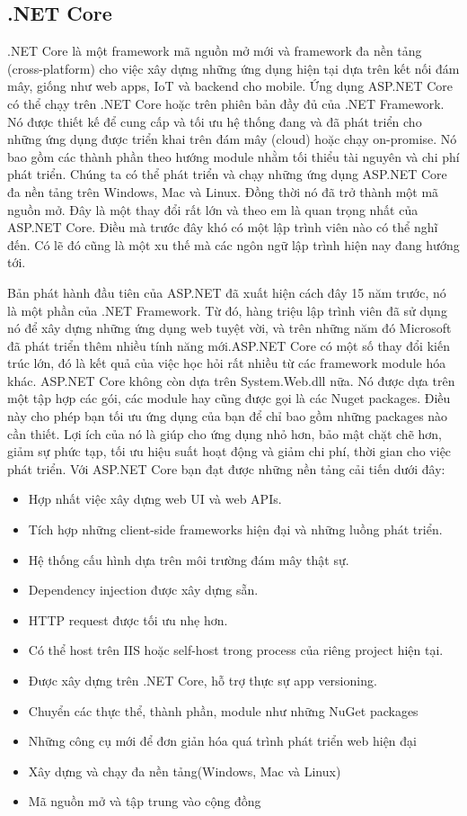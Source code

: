 \subsection{.NET Core}
.NET Core là một framework mã nguồn mở mới và framework đa nền tảng (cross-platform) cho việc xây dựng những ứng dụng hiện tại dựa trên kết nối đám mây, giống như web apps, IoT và backend cho mobile. Ứng dụng ASP.NET Core có thể chạy trên .NET Core hoặc trên phiên bản đầy đủ của .NET Framework. Nó được thiết kế để cung cấp và tối ưu hệ thống đang và đã phát triển cho những ứng dụng được triển khai trên đám mây (cloud) hoặc chạy on-promise. Nó bao gồm các thành phần theo hướng module nhằm tối thiểu tài nguyên và chi phí phát triển. Chúng ta có thể phát triển và chạy những ứng dụng ASP.NET Core đa nền tảng trên Windows, Mac và Linux. Đồng thời nó đã trở thành một mã nguồn mở. Đây là một thay đổi rất lớn và theo em là quan trọng nhất của ASP.NET Core. Điều mà trước đây khó có một lập trình viên nào có thể nghĩ đến. Có lẽ đó cũng là một xu thế mà các ngôn ngữ lập trình hiện nay đang hướng tới.
\par
Bản phát hành đầu tiên của ASP.NET đã xuất hiện cách đây 15 năm trước, nó là một phần của .NET Framework. Từ đó, hàng triệu lập trình viên đã sử dụng nó để xây dựng những ứng dụng web tuyệt vời, và trên những năm đó Microsoft đã phát triển thêm nhiều tính năng mới.ASP.NET Core có một số thay đổi kiến trúc lớn, đó là kết quả của việc học hỏi rất nhiều từ các framework module hóa khác. ASP.NET Core không còn dựa trên System.Web.dll nữa. Nó được dựa trên một tập hợp các gói, các module hay cũng được gọi là các Nuget packages. Điều này cho phép bạn tối ưu ứng dụng của bạn để chỉ bao gồm những packages nào cần thiết. Lợi ích của nó là giúp cho ứng dụng nhỏ hơn, bảo mật chặt chẽ hơn, giảm sự phức tạp, tối ưu hiệu suất hoạt động và giảm chi phí, thời gian cho việc phát triển.
Với ASP.NET Core bạn đạt được những nền tảng cải tiến dưới đây:
\begin{itemize}
\item Hợp nhất việc xây dựng web UI và web APIs.
\item Tích hợp những client-side frameworks hiện đại và những luồng phát triển.
\item Hệ thống cấu hình dựa trên môi trường đám mây thật sự.
\item Dependency injection được xây dựng sẵn.
\item HTTP request được tối ưu nhẹ hơn.
\item Có thể host trên IIS hoặc self-host trong process của riêng project hiện tại.
\item Được xây dựng trên .NET Core, hỗ trợ thực sự app versioning.
\item Chuyển các thực thể, thành phần, module như những NuGet packages
\item Những công cụ mới để đơn giản hóa quá trình phát triển web hiện đại
\item Xây dựng và chạy đa nền tảng(Windows, Mac và Linux)
\item Mã nguồn mở và tập trung vào cộng đồng
\end{itemize}

